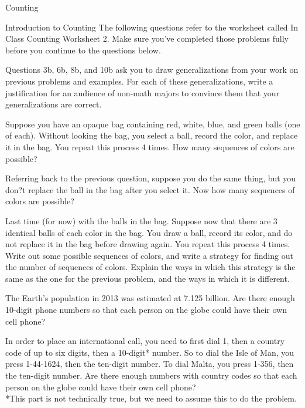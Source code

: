 \begin{chapter}{Counting}
\begin{section}{Introduction to Counting}
The following questions refer to the worksheet called In Class Counting Worksheet 2. Make sure you've completed those problems fully before you continue to the questions below.

\begin{question}
Questions 3b, 6b, 8b, and 10b ask you to draw generalizations from your work on previous problems and examples. For each of these generalizations, write a justification for an audience of non-math majors to convince them that your generalizations are correct.
\end{question}
\begin{exercise}
Suppose you have an opaque bag containing red, white, blue, and green balls (one of each). Without looking the bag, you select a ball, record the color, and replace it in the bag. You repeat this process 4 times. How many sequences of colors are possible?
\end{exercise}
\begin{exercise}
Referring back to the previous question, suppose you do the same thing, but you don?t replace the ball in the bag after you select it. Now how many sequences of colors are possible?
\end{exercise}

\begin{exercise}
Last time (for now) with the balls in the bag. Suppose now that there are 3 identical balls of each color in the bag. You draw a ball, record its color, and do not replace it in the bag before drawing again. You repeat this process 4 times. Write out some possible sequences of colors, and write a strategy for finding out the number of sequences of colors. Explain the ways in which this strategy is the same as the one for the previous problem, and the ways in which it is different.
\end{exercise}

\begin{exercise}
The Earth's population in 2013 was estimated at 7.125 billion. Are there enough 10-digit phone numbers so that each person on the globe could have their own cell phone?
\end{exercise}
\begin{exercise}
In order to place an international call, you need to first dial 1, then a country code of up to six digits, then a 10-digit* number. So to dial the Isle of Man, you press 1-44-1624, then the ten-digit number. To dial Malta, you press 1-356, then the ten-digit number. Are there enough numbers with country codes so that each person on the globe could have their own cell phone?\\
*This part is not technically true, but we need to assume this to do the problem.
\end{exercise}


\end{section}
\end{chapter}
